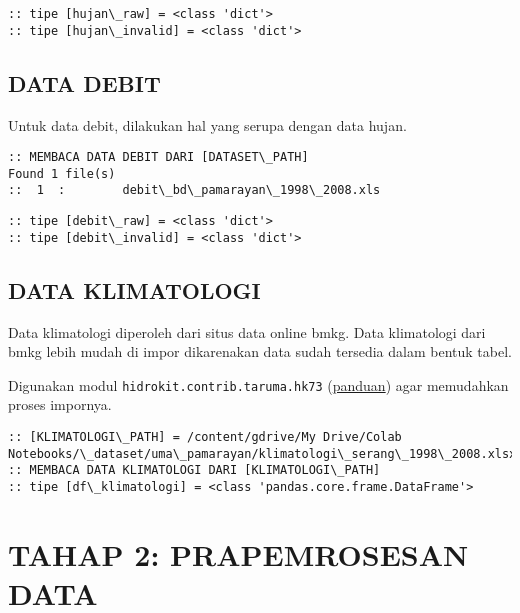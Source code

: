 \documentclass[11pt]{article}
\let\oldsection\section
\renewcommand\section{\clearpage\oldsection}
\begin{document}
    \begin{Verbatim}[commandchars=\\\{\}]
:: tipe [hujan\_raw] = <class 'dict'>
:: tipe [hujan\_invalid] = <class 'dict'>
    \end{Verbatim}

    \hypertarget{data-debit}{%
\subsection{DATA DEBIT}\label{data-debit}}

Untuk data debit, dilakukan hal yang serupa dengan data hujan.

    \begin{Verbatim}[commandchars=\\\{\}]
:: MEMBACA DATA DEBIT DARI [DATASET\_PATH]
Found 1 file(s)
::  1  :        debit\_bd\_pamarayan\_1998\_2008.xls
    \end{Verbatim}

    \begin{Verbatim}[commandchars=\\\{\}]
:: tipe [debit\_raw] = <class 'dict'>
:: tipe [debit\_invalid] = <class 'dict'>
    \end{Verbatim}

    \hypertarget{data-klimatologi}{%
\subsection{DATA KLIMATOLOGI}\label{data-klimatologi}}

Data klimatologi diperoleh dari situs data online bmkg. Data klimatologi
dari bmkg lebih mudah di impor dikarenakan data sudah tersedia dalam
bentuk tabel.

Digunakan modul \texttt{hidrokit.contrib.taruma.hk73}
(\href{https://nbviewer.jupyter.org/gist/taruma/b00880905f297013f046dad95dc2e284}{panduan})
agar memudahkan proses impornya.

    \begin{Verbatim}[commandchars=\\\{\}]
:: [KLIMATOLOGI\_PATH] = /content/gdrive/My Drive/Colab
Notebooks/\_dataset/uma\_pamarayan/klimatologi\_serang\_1998\_2008.xlsx
:: MEMBACA DATA KLIMATOLOGI DARI [KLIMATOLOGI\_PATH]
:: tipe [df\_klimatologi] = <class 'pandas.core.frame.DataFrame'>
    \end{Verbatim}

    \hypertarget{tahap-2-prapemrosesan-data}{%
\section{TAHAP 2: PRAPEMROSESAN DATA}\label{tahap-2-prapemrosesan-data}}
\end{document}
